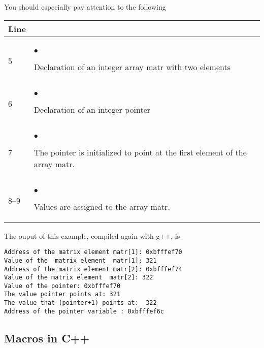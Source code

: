 You should especially pay attention to the following
%
{\small
\begin{center}
%
\begin{tabular}{|ll|}\hline
\hfill Line \hfill
&\hspace*{\fill}  \hspace*{\fill}\\ \hline
&  \\[-2mm]
5 &$\bullet$
\begin{minipage}[t]{0.65\textwidth}
Declaration of an integer array matr with two elements
\end{minipage}\\
6 &$\bullet$
\begin{minipage}[t]{0.65\textwidth}
Declaration of an integer pointer
\end{minipage}\\
7 &$\bullet$
\begin{minipage}[t]{0.65\textwidth}
The pointer is initialized to point at the first element of the 
array matr.
\end{minipage}\\
8--9 &$\bullet$
\begin{minipage}[t]{0.65\textwidth}
Values are assigned to the array matr.
\end{minipage}\\[1ex]  
\hline  
\end{tabular}  
\end{center}  
} %
The ouput of this example, compiled again with g++, is
\begin{tcolorbox}
\begin{verbatim}
Address of the matrix element matr[1]: 0xbfffef70
Value of the  matrix element  matr[1]; 321
Address of the matrix element matr[2]: 0xbfffef74
Value of the matrix element  matr[2]: 322
Value of the pointer: 0xbfffef70
The value pointer points at: 321
The value that (pointer+1) points at:  322
Address of the pointer variable : 0xbfffef6c
\end{verbatim}
\end{tcolorbox}


\subsection{Macros in C++}

